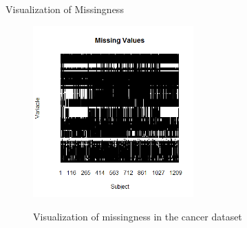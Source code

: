 \begin{frame}{Visualization of Missingness}
 \begin{figure}[h!]
  \centering

    \includegraphics[width=0.55\textwidth]{missingvalues_plot.png}
\label{fig:missingplot}
    \caption{Visualization of missingness in the cancer dataset}

\end{figure}
\end{frame}

